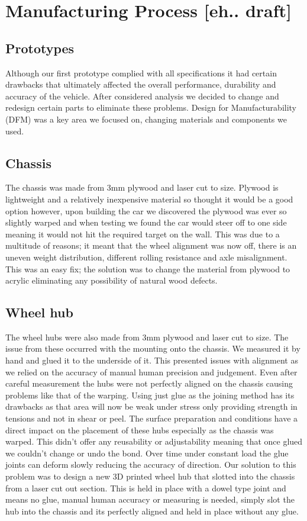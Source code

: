 \documentclass{article}
\begin{document}
\newpage
\section{Manufacturing Process [eh.. draft]}

\subsection{Prototypes}
Although our first prototype complied with all specifications it had certain drawbacks that ultimately affected the overall performance, durability and accuracy of the vehicle. After considered analysis we decided to change and redesign certain parts to eliminate these problems. Design for Manufacturability (DFM) was a key area we focused on, changing materials and components we used. 
\subsection{Chassis}
The chassis was made from 3mm plywood and laser cut to size. Plywood is lightweight and a relatively inexpensive material so thought it would be a good option however, upon building the car we discovered the plywood was ever so slightly warped and when testing we found the car would steer off to one side meaning it would not hit the required target on the wall. This was due to a multitude of reasons; it meant that the wheel alignment was now off, there is an uneven weight distribution, different rolling resistance and axle misalignment. This was an easy fix; the solution was to change the material from plywood to acrylic eliminating any possibility of natural wood defects.  
\subsection{Wheel hub}
The wheel hubs were also made from 3mm plywood and laser cut to size. The issue from these occurred with the mounting onto the chassis. We measured it by hand and glued it to the underside of it. This presented issues with alignment as we relied on the accuracy of manual human precision and judgement. Even after careful measurement the hubs were not perfectly aligned on the chassis causing problems like that of the warping. Using just glue as the joining method has its drawbacks as that area will now be weak under stress only providing strength in tensions and not in shear or peel. The surface preparation and conditions have a direct impact on the placement of these hubs especially as the chassis was warped. This didn't offer any reusability or adjustability meaning that once glued we couldn't change or undo the bond. Over time under constant load the glue joints can deform slowly reducing the accuracy of direction. Our solution to this problem was to design a new 3D printed wheel hub that slotted into the chassis from a laser cut out section. This is held in place with a dowel type joint and means no glue, manual human accuracy or measuring is needed, simply slot the hub into the chassis and its perfectly aligned and held in place without any glue.  
\end{document}
